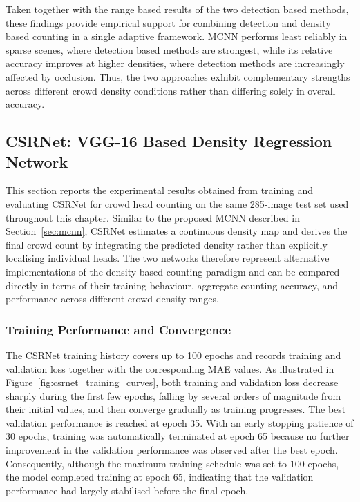 \documentclass[12pt,a4paper]{report}
\begin{document}
Taken together with the range based results of the two detection based methods, these findings provide empirical support for combining detection and density based counting in a single adaptive framework. MCNN performs least reliably in sparse scenes, where detection based methods are strongest, while its relative accuracy improves at higher densities, where detection methods are increasingly affected by occlusion. Thus, the two approaches exhibit complementary strengths across different crowd density conditions rather than differing solely in overall accuracy.

\subsection{CSRNet: VGG-16 Based Density Regression Network}
\label{sec:csrnet}

This section reports the experimental results obtained from training and evaluating CSRNet for crowd head counting on the same 285-image test set used throughout this chapter. Similar to the proposed MCNN described in Section~\ref{sec:mcnn}, CSRNet estimates a continuous density map and derives the final crowd count by integrating the predicted density rather than explicitly localising individual heads. The two networks therefore represent alternative implementations of the density based counting paradigm and can be compared directly in terms of their training behaviour, aggregate counting accuracy, and performance across different crowd-density ranges.

\subsubsection{Training Performance and Convergence}

The CSRNet training history covers up to 100 epochs and records training and validation loss together with the corresponding MAE values. As illustrated in Figure~\ref{fig:csrnet_training_curves}, both training and validation loss decrease sharply during the first few epochs, falling by several orders of magnitude from their initial values, and then converge gradually as training progresses. The best validation performance is reached at epoch 35. With an early stopping patience of 30 epochs, training was automatically terminated at epoch 65 because no further improvement in the validation performance was observed after the best epoch. Consequently, although the maximum training schedule was set to 100 epochs, the model completed training at epoch 65, indicating that the validation performance had largely stabilised before the final epoch.
\end{document}
